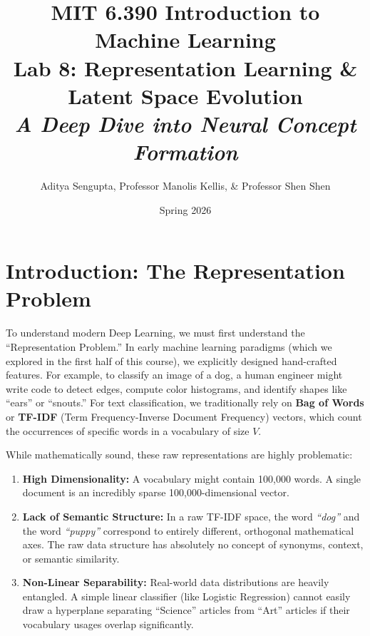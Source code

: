 \documentclass[11pt]{article}
\title{\textbf{MIT 6.390 Introduction to Machine Learning} \\ \LARGE Lab 8: Representation Learning \& Latent Space Evolution \\ \Large \textit{A Deep Dive into Neural Concept Formation}}
\author{Aditya Sengupta, Professor Manolis Kellis, \& Professor Shen Shen}
\date{Spring 2026}
\begin{document}
\maketitle

\section{Introduction: The Representation Problem}

To understand modern Deep Learning, we must first understand the ``Representation Problem.'' In early machine learning paradigms (which we explored in the first half of this course), we explicitly designed hand-crafted features. For example, to classify an image of a dog, a human engineer might write code to detect edges, compute color histograms, and identify shapes like ``ears'' or ``snouts.'' For text classification, we traditionally rely on \textbf{Bag of Words} or \textbf{TF-IDF} (Term Frequency-Inverse Document Frequency) vectors, which count the occurrences of specific words in a vocabulary of size $V$.

While mathematically sound, these raw representations are highly problematic:
\begin{enumerate}
    \item \textbf{High Dimensionality:} A vocabulary might contain 100,000 words. A single document is an incredibly sparse 100,000-dimensional vector.
    \item \textbf{Lack of Semantic Structure:} In a raw TF-IDF space, the word \textit{``dog''} and the word \textit{``puppy''} correspond to entirely different, orthogonal mathematical axes. The raw data structure has absolutely no concept of synonyms, context, or semantic similarity. 
    \item \textbf{Non-Linear Separability:} Real-world data distributions are heavily entangled. A simple linear classifier (like Logistic Regression) cannot easily draw a hyperplane separating ``Science'' articles from ``Art'' articles if their vocabulary usages overlap significantly.
\end{enumerate}
\end{document}
